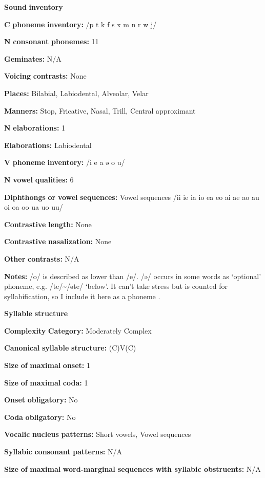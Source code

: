 \begin{styleBody}
\textbf{Sound} \textbf{inventory}

\textbf{C} \textbf{phoneme} \textbf{inventory:} /p t k f s x m n r w j/

\textbf{N} \textbf{consonant} \textbf{phonemes:} 11

\textbf{Geminates:} N/A

\textbf{Voicing} \textbf{contrasts:} None

\textbf{Places:} Bilabial, Labiodental, Alveolar, Velar

\textbf{Manners:} Stop, Fricative, Nasal, Trill, Central approximant

\textbf{N} \textbf{elaborations:} 1

\textbf{Elaborations:} Labiodental

\textbf{V} \textbf{phoneme} \textbf{inventory:} /i e a ə o u/

\textbf{N} \textbf{vowel} \textbf{qualities:} 6

\textbf{Diphthongs} \textbf{or} \textbf{vowel} \textbf{sequences:} Vowel sequences /ii ie ia io ea eo ai ae ao au oi oa oo ua uo uu/

\textbf{Contrastive} \textbf{length:} None

\textbf{Contrastive} \textbf{nasalization:} None

\textbf{Other} \textbf{contrasts:} N/A

\textbf{Notes:} /o/ is described as lower than /e/. /ə/ occurs in some words as ‘optional’ phoneme, e.g. /te/{\textasciitilde}/əte/ ‘below’. It can’t take stress but is counted for syllabification, so I include it here as a phoneme \citep[15-18]{Dol2007}.

\textbf{Syllable} \textbf{structure}

\textbf{Complexity} \textbf{Category:} Moderately Complex

\textbf{Canonical} \textbf{syllable} \textbf{structure:} (C)V(C) \citep[34-8]{Dol2007}

\textbf{Size} \textbf{of} \textbf{maximal} \textbf{onset:} 1

\textbf{Size} \textbf{of} \textbf{maximal} \textbf{coda:} 1

\textbf{Onset} \textbf{obligatory:} No

\textbf{Coda} \textbf{obligatory:} No

\textbf{Vocalic} \textbf{nucleus} \textbf{patterns:} Short vowels, Vowel sequences

\textbf{Syllabic} \textbf{consonant} \textbf{patterns:} N/A

\textbf{Size} \textbf{of} \textbf{maximal} \textbf{word{}-marginal sequences with syllabic obstruents:} N/A


\end{styleBody}
